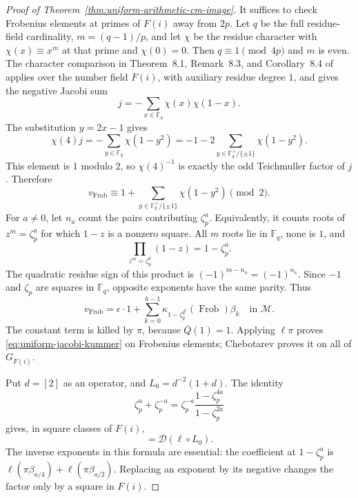 \begin{proof}[Proof of Theorem~\ref{thm:uniform-arithmetic-cm-image}]
It suffices to check Frobenius elements at primes of \(F(i)\)
away from \(2p\). Let \(q\) be the full residue-field cardinality,
\(m=(q-1)/p\), and let \(\chi\) be the residue character with
\(\chi(x)\equiv x^m\) at that prime and \(\chi(0)=0\).
Then \(q\equiv1\pmod{4p}\) and \(m\) is even. The
character comparison in Theorem~8.1, Remark~8.3, and
Corollary~8.4 of \cite{Otsubo2016} applies over the number field
\(F(i)\), with auxiliary residue degree \(1\), and gives the
negative Jacobi sum
\[
 j=-\sum_{x\in\mathbb F_q}\chi(x)\chi(1-x).
\]
The substitution \(y=2x-1\) gives
\[
 \chi(4)j=-\sum_{y\in\mathbb F_q}\chi(1-y^2)
        =-1-2\sum_{y\in\mathbb F_q^\times/\{\pm1\}}
                                      \chi(1-y^2).
\]
This element is \(1\) modulo \(2\), so \(\chi(4)^{-1}\) is
exactly the odd Teichmuller factor of \(j\). Therefore
\[
 v_{\operatorname{Frob}}\equiv
 1+\sum_{y\in\mathbb F_q^\times/\{\pm1\}}\chi(1-y^2)
                                                   \pmod2.
\]
For \(a\ne0\), let \(n_a\) count the pairs contributing
\(\zeta_p^a\). Equivalently, it counts roots of \(z^m=\zeta_p^a\)
for which \(1-z\) is a nonzero square. All \(m\) roots lie in
\(\mathbb F_q\), none is \(1\), and
\[
 \prod_{z^m=\zeta_p^a}(1-z)=1-\zeta_p^a.
\]
The quadratic residue sign of this product is
\((-1)^{m-n_a}=(-1)^{n_a}\). Since \(-1\) and \(\zeta_p\)
are squares in \(\mathbb F_q\), opposite exponents have the
same parity. Thus
\[
 v_{\operatorname{Frob}}=
 \epsilon\cdot1+\sum_{k=0}^{h-1}
     \kappa_{1-\zeta_p^{g^k}}(\operatorname{Frob})\beta_k
       \quad\text{in }\mathscr M.
\]
The constant term is killed by \(\pi\), because
\(\overline Q(1)=1\). Applying \(\ell\pi\) proves
\eqref{eq:uniform-jacobi-kummer} on Frobenius elements;
Chebotarev proves it on all of \(G_{F(i)}\).

Put \(d=[2]\) as an operator, and \(L_0=d^{-2}(1+d)\).
The identity
\[
 \zeta_p^a+\zeta_p^{-a}
  =\zeta_p^{-a}\frac{1-\zeta_p^{4a}}{1-\zeta_p^{2a}}
\]
gives, in square classes of \(F(i)\),
\begin{equation}
 [u_\ell]=\mathscr D(\ell\circ L_0).
 \label{eq:uniform-dual-reindexing}
\end{equation}
The inverse exponents in this formula are essential:
the coefficient at \(1-\zeta_p^a\) is
\(\ell(\pi\beta_{a/4})+\ell(\pi\beta_{a/2})\).
Replacing an exponent by its negative changes the factor
only by a square in \(F(i)\).


\end{proof}
